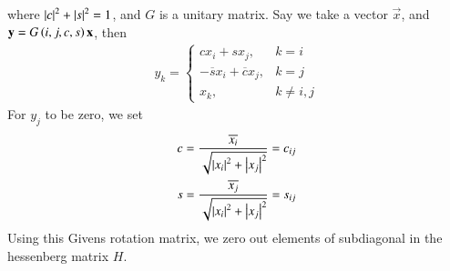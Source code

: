 \documentclass[journal]{IEEEtran}
\begin{document}
where $\left\vert c\right\vert^2 + \left\vert s\right\vert^2 = 1$, and $G$ is a unitary matrix.
\newline
Say we take a vector $\vec{x}$, and $\mathbf{y} = G\left(i, j, c, s\right)\mathbf{x}$, then
\begin{align}
	y_k = \begin{cases}
		c x_i + s x_j, & k = i \\
		-\overline{s} x_i + \overline{c} x_j, & k = j \\
		x_k, & k \neq i, j
	\end{cases}
\end{align}
For $y_j$ to be zero, we set
\begin{align}
	c = \frac{\overline{x_i}}{\sqrt{\left\vert x_i\right\vert^2 + \left\vert x_j\right\vert^2}} = c_{ij}\\
	s = \frac{\overline{x_j}}{\sqrt{\left\vert x_i\right\vert^2 + \left\vert x_j\right\vert^2}} = s_{ij}
\end{align}
Using this Givens rotation matrix, we zero out elements of subdiagonal in the hessenberg matrix $H$.
\end{document}
